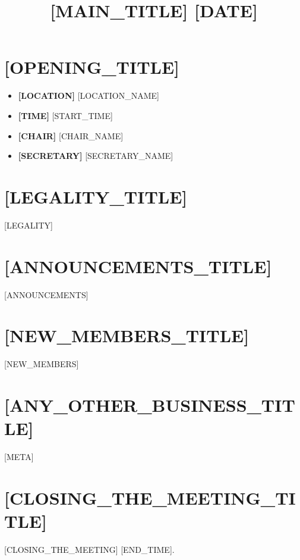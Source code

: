 \documentclass[12pt]{article}
\title{[MAIN_TITLE] [DATE]} %
\author{}
\begin{document}
\maketitle
 
\tableofcontents

\section{[OPENING_TITLE]}

\begin{itemize}
	\item{\textbf{[LOCATION]} [LOCATION_NAME]}
	\item{\textbf{[TIME]} [START_TIME]}
	\item{\textbf{[CHAIR]} [CHAIR_NAME]}
	\item{\textbf{[SECRETARY]} [SECRETARY_NAME]}
\end{itemize}

\section{[LEGALITY_TITLE]}

[LEGALITY]

\section{[ANNOUNCEMENTS_TITLE]}
[ANNOUNCEMENTS]

\section{[NEW_MEMBERS_TITLE]}
[NEW_MEMBERS]

\section{[ANY_OTHER_BUSINESS_TITLE]}
[META]

\section{[CLOSING_THE_MEETING_TITLE]}
[CLOSING_THE_MEETING] [END_TIME].
\end{document}

